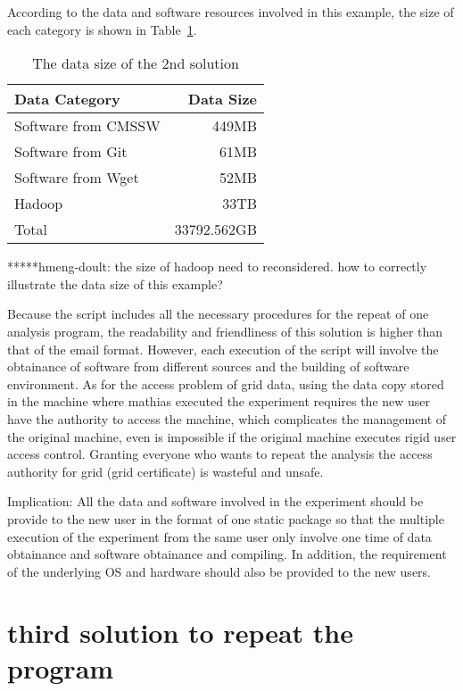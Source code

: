 \documentclass{acm_proc_article-sp}
\begin{document}
According to the data and software resources involved in this example, the size of each category is shown in Table~\ref{table:datasize-2nd}.

\begin{table}
    \centering
    \begin{tabular}{|l|r|}
    \hline
    Data Category & Data Size \\ \hline
    Software from CMSSW & 449MB \\ \hline
    Software from Git & 61MB \\ \hline
    Software from Wget & 52MB \\ \hline
    Hadoop & 33TB \\ \hline
    Total & 33792.562GB \\ \hline
    \end{tabular}
    \caption{The data size of the 2nd solution}
    \label{table:datasize-2nd}
\end{table}

*****hmeng-doult: the size of hadoop need to reconsidered. how to correctly illustrate the data size of this example?

Because the script includes all the necessary procedures for the repeat of one analysis program, the readability and friendliness of this solution is higher than that of the email format. However, each execution of the script will involve the obtainance of software from different sources and the building of software environment. As for the access problem of grid data, using the data copy stored in the machine where mathias executed the experiment requires the new user have the authority to access the machine, which complicates the management of the original machine, even is impossible if the original machine executes rigid user access control. Granting everyone who wants to repeat the analysis the access authority for grid (grid certificate) is wasteful and unsafe. 

Implication: All the data and software involved in the experiment should be provide to the new user in the format of one static package so that the multiple execution of the experiment from the same user only involve one time of data obtainance and software obtainance and compiling. In addition, the requirement of the underlying OS and hardware should also be provided to the new users.

\section{third solution to repeat the program}
\end{document}

